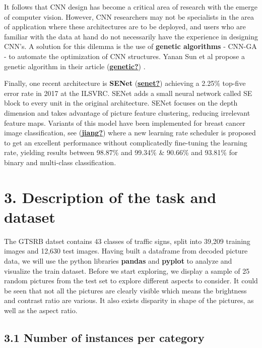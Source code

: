 \documentclass[
  11pt,
]{article}
\begin{document}
It follows that CNN design has become a critical area of research with
the emerge of computer vision. However, CNN researchers may not be
specialists in the area of application where these architectures are to
be deployed, and users who are familiar with the data at hand do not
necessarily have the experience in designing CNN's. A solution for this
dilemma is the use of \textbf{genetic algorithms} - CNN-GA - to automate
the optimization of CNN structures. Yanan Sun et al propose a genetic
algorithm in their article
(\protect\hyperlink{ref-genetic}{\textbf{genetic?}}) .

Finally, one recent architecture is \textbf{SENet}
(\protect\hyperlink{ref-senet}{\textbf{senet?}}) achieving a 2.25\%
top-five error rate in 2017 at the ILSVRC. SENet adds a small neural
network called SE block to every unit in the original architecture.
SENet focuses on the depth dimension and takes advantage of picture
feature clustering, reducing irrelevant feature maps. Variants of this
model have been implemented for breast cancer image classification, see
(\protect\hyperlink{ref-jiang}{\textbf{jiang?}}) where a new learning
rate scheduler is proposed to get an excellent performance without
complicatedly fine-tuning the learning rate, yielding results between
98.87\% and 99.34\% \& 90.66\% and 93.81\% for binary and multi-class
classification.

\pagebreak

\hypertarget{description-of-the-task-and-dataset}{%
\section{3. Description of the task and
dataset}\label{description-of-the-task-and-dataset}}

The GTSRB datset contains 43 classes of traffic signs, split into 39,209
training images and 12,630 test images. Having built a dataframe from
decoded picture data, we will use the python libraries \textbf{pandas}
and \textbf{pyplot} to analyze and visualize the train dataset. Before
we start exploring, we display a sample of 25 random pictures from the
test set to explore different aspects to consider. It could be seen that
not all the pictures are clearly visible which means the brightness and
contrast ratio are various. It also exists disparity in shape of the
pictures, as well as the aspect ratio.

\hypertarget{number-of-instances-per-category}{%
\subsection{3.1 Number of instances per
category}\label{number-of-instances-per-category}}
\end{document}
